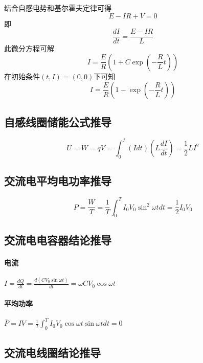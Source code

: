 结合自感电势和基尔霍夫定律可得
\begin{equation*}
    E-IR+V=0
\end{equation*}
即
\begin{equation*}
    \frac{dI}{dt}=\frac{E-IR}{L}
\end{equation*}
此微分方程可解
\begin{equation*}
    I=\frac{E}{R}\left(1+C\exp\left(-\frac{R}{L}t\right)\right)
\end{equation*}
在初始条件$(t,I)=(0,0)$下可知
\begin{equation*}
    I=\frac{E}{R}\left(1-\exp\left(-\frac{R}{L}t\right)\right)
\end{equation*}

\subsection{自感线圈储能公式推导}

\begin{equation*}
    U=W=qV
    =\int_0^I(Idt)\left(L\frac{dI}{dt}\right)
    =\frac12LI^2
\end{equation*}

\subsection{交流电平均电功率推导}

\begin{equation*}
    P=\frac{W}{T}
    =\frac1T\int_0^TI_0V_0\sin^2\omega tdt
    =\frac12I_0V_0
\end{equation*}

\subsection{交流电电容器结论推导}

\paragraph{电流} $I=\frac{dQ}{dt}=\frac{d(CV_0\sin\omega t)}{dt}=\omega CV_0\cos\omega t$

\paragraph{平均功率} $\bar{P}=IV=\frac1T\int_0^TI_0V_0\cos\omega t\sin\omega tdt=0$

\subsection{交流电线圈结论推导}

